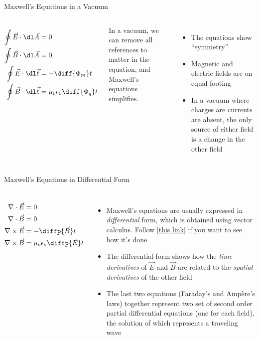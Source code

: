\documentclass[12pt,aspectratio=169]{beamer}
\begin{document}
\begin{frame}{Maxwell's Equations in a Vacuum}
  \begin{columns}
    \large
    \begin{align*}
      \oint\vec E\cdot\dl\vec A &= 0 \\
      \oint\vec B\cdot\dl\vec A &= 0 \\
      \oint\vec E\cdot\dl\vec\ell &=-\diff{\Phi_m}t \\
      \oint\vec B\cdot\dl\vec\ell &=\mu_0\epsilon_0\diff{\Phi_q}t\\
    \end{align*}

    In a vacuum, we can remove all references to matter in the equation, and
    Maxwell's equations simplifies.
    \begin{itemize}
    \item The equations show ``symmetry''
    \item Magnetic and electric fields are on equal footing
    \item In a vacuum where charges are currents are absent, the only source of
      either field is a change in the other field
    \end{itemize}
  \end{columns}
\end{frame}



\begin{frame}{Maxwell's Equations in Differential Form}
  \begin{columns}
    \large
    \begin{align*}
      \nabla\cdot\vec E &= 0\\
      \nabla\cdot\vec B &= 0\\
      \nabla\times\vec E &=-\diffp{\vec B}t \\
      \nabla\times\vec B &=\mu_o\epsilon_o\diffp{\vec E}t
    \end{align*}

    \begin{itemize}
    \item Maxwell's equations are usually expressed in \emph{differential} form,
      which is obtained using vector calculus. Follow
      [\underline{\href{https://www.wikihow.com/Convert-Maxwell\%27s-Equations-into-Differential-Form}{this link}}] if you want to see how it's done.
    \item The differential form shows how the \emph{time derivatives} of
      $\vec E$ and $\vec B$ are related to the \emph{spatial derivatives}
      of the other field
    \item The last two equations (Faraday's and Amp\`{e}re's laws) together
      represent two set of second order partial differential equations (one for
      each field), the solution of which represents a traveling wave
    \end{itemize}
  \end{columns}
\end{frame}
\end{document}
